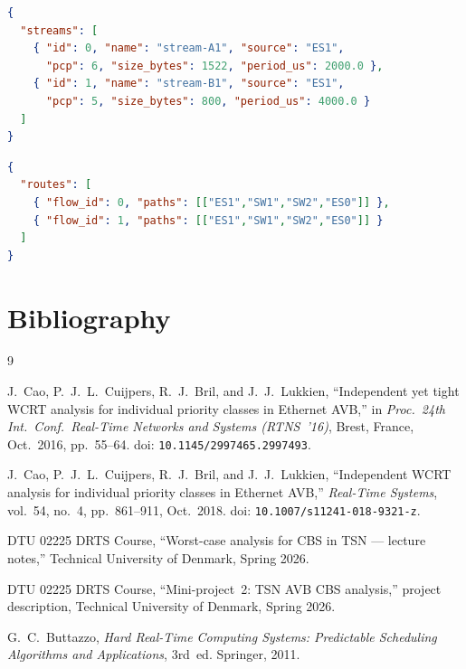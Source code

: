 \documentclass[11pt,a4paper]{article}
\begin{document}
\begin{lstlisting}[language=json, caption={Streams file fragment.}]
{
  "streams": [
    { "id": 0, "name": "stream-A1", "source": "ES1",
      "pcp": 6, "size_bytes": 1522, "period_us": 2000.0 },
    { "id": 1, "name": "stream-B1", "source": "ES1",
      "pcp": 5, "size_bytes": 800, "period_us": 4000.0 }
  ]
}
\end{lstlisting}

\begin{lstlisting}[language=json, caption={Routes file fragment.}]
{
  "routes": [
    { "flow_id": 0, "paths": [["ES1","SW1","SW2","ES0"]] },
    { "flow_id": 1, "paths": [["ES1","SW1","SW2","ES0"]] }
  ]
}
\end{lstlisting}

\section{Bibliography}

\begin{thebibliography}{9}

J.~Cao, P.~J.~L.~Cuijpers, R.~J.~Bril, and J.~J.~Lukkien,
``Independent yet tight WCRT analysis for individual priority classes
in Ethernet AVB,''
in \textit{Proc.\ 24th Int.\ Conf.\ Real-Time Networks and Systems
(RTNS~'16)}, Brest, France, Oct.\ 2016, pp.\ 55--64.
doi: \texttt{10.1145/2997465.2997493}.

J.~Cao, P.~J.~L.~Cuijpers, R.~J.~Bril, and J.~J.~Lukkien,
``Independent WCRT analysis for individual priority classes in Ethernet AVB,''
\textit{Real-Time Systems}, vol.~54, no.~4, pp.\ 861--911, Oct.\ 2018.
doi: \texttt{10.1007/s11241-018-9321-z}.

DTU 02225 DRTS Course,
``Worst-case analysis for CBS in TSN --- lecture notes,''
Technical University of Denmark, Spring 2026.

DTU 02225 DRTS Course,
``Mini-project~2: TSN AVB CBS analysis,'' project description,
Technical University of Denmark, Spring 2026.

G.~C.~Buttazzo,
\textit{Hard Real-Time Computing Systems: Predictable Scheduling Algorithms
and Applications}, 3rd~ed.
Springer, 2011.

\end{thebibliography}
\end{document}

